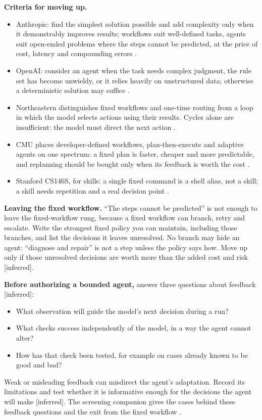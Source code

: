 \documentclass[10pt]{article}
\newcommand{\inferred}{\textsf{\small[inferred]}}
\begin{document}
\textbf{Criteria for moving up.}
\begin{itemize}
\item Anthropic: find the simplest solution possible and add complexity only when it demonstrably improves results; workflows suit well-defined tasks, agents suit open-ended problems where the steps cannot be predicted, at the price of cost, latency and compounding errors \cite[``When (and when not) to use agents'']{bea}.
\item OpenAI: consider an agent when the task needs complex judgment, the rule set has become unwieldy, or it relies heavily on unstructured data; otherwise a deterministic solution may suffice \cite[pp.~5--6]{openai}.
\item Northeastern distinguishes fixed workflows and one-time routing from a loop in which the model selects actions using their results. Cycles alone are insufficient: the model must direct the next action \cite[slides~9, 10, 14]{neu4a}.
\item CMU places developer-defined workflows, plan-then-execute and adaptive agents on one spectrum: a fixed plan is faster, cheaper and more predictable, and replanning should be bought only when its feedback is worth the cost \cite[p.~16]{cmu5}.
\item Stanford CS146S, for skills: a single fixed command is a shell alias, not a skill; a skill needs repetition and a real decision point \cite[Part~I]{cs146s3}.
\end{itemize}

\textbf{Leaving the fixed workflow.} ``The steps cannot be predicted'' is not enough to leave the fixed-workflow rung, because a fixed workflow can branch, retry and escalate. Write the strongest fixed policy you can maintain, including those branches, and list the decisions it leaves unresolved. No branch may hide an agent: ``diagnose and repair'' is not a step unless the policy says how. Move up only if those unresolved decisions are worth more than the added cost and risk \inferred.

\textbf{Before authorizing a bounded agent,} answer three questions about feedback \inferred:
\begin{itemize}
\item What observation will guide the model's next decision during a run?
\item What checks success independently of the model, in a way the agent cannot alter?
\item How has that check been tested, for example on cases already known to be good and bad?
\end{itemize}
Weak or misleading feedback can misdirect the agent's adaptation. Record its limitations and test whether it is informative enough for the decisions the agent will make \inferred. The screening companion gives the cases behind these feedback questions and the exit from the fixed workflow \cite[Sections~3--4]{screen}.
\end{document}
